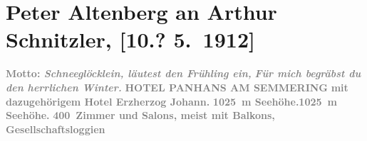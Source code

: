 

         
         \renewcommand{\erwaehntePersonen}{Personen: Anton Bulling, Bernhard von Bülow,  Franz Ferdinand von Österreich-Este,  Karl I. von Österreich-Ungarn,  Karl Stephan von Österreich, Franz Panhans}
         \renewcommand{\erwaehnteInstitutionen}{Institutionen: Österreichischer Wintersport-Klub}
         \renewcommand{\erwaehnteOrte}{Orte: Bad Gastein, Davos, Franzensbad, Grado, Hotel Erzherzog Johann, Hotel Panhans, Karlsbad, Kirche zur heiligen Familie, Marienbad, Opatija, Piešťany, Semmering, Teplice, Triest}
         \renewcommand{\erwaehnteWerke}{Werke: Der Tod des Junggesellen, Masken und Wunder. Novellen, Tagebuch}
               \section[Peter Altenberg an Arthur Schnitzler, {[}10.? 5. 1912{]}]{ Peter Altenberg an Arthur Schnitzler, {[}10.? 5. 1912{]}}\nopagebreak{}\rehead{ }\begin{ledgroupsized}[t]{13cm}\normalsize\beginnumbering \toendnotes[C]{\smallbreak\pagebreak[2]} 
\toendnotes[C]{\smallbreak}\pstart
           \noindent{}\raggedleft{}{\pb}\textcolor{gray}{\textbf{Motto: \emph{Schneeglöcklein, läutest den Frühling
                     ein,}}}\pend
           \pstart
           \noindent{}\raggedleft{}\textcolor{gray}{\textbf{\emph{Für mich begräbst du den herrlichen Winter.}}}\pend
           \pstart
           \noindent{}\centering{}\textcolor{gray}{\textbf{HOTEL PANHANS AM SEMMERING}}\pend
           \pstart
           \noindent{}\centering{}\textcolor{gray}{\textbf{mit dazugehörigem Hotel Erzherzog
                     Johann.}}\pend
           \pstart
           \noindent{}\textcolor{gray}{\textbf{1025 m Seehöhe.}}\hfill \textcolor{gray}{\textbf{1025 m Seehöhe.}}\pend
           \pstart
           \centering{}\textcolor{gray}{\textbf{400 Zimmer und Salons, meist mit Balkons, Gesellschaftsloggien
}}
\end{ledgroupsized}
